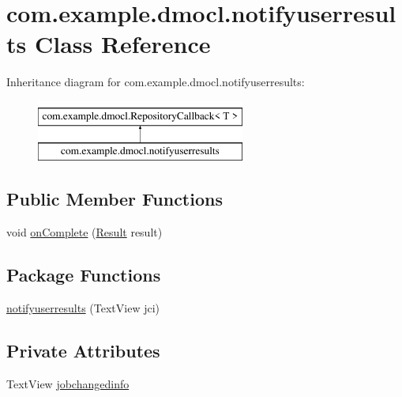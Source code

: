 \hypertarget{classcom_1_1example_1_1dmocl_1_1notifyuserresults}{}\section{com.\+example.\+dmocl.\+notifyuserresults Class Reference}
\label{classcom_1_1example_1_1dmocl_1_1notifyuserresults}
Inheritance diagram for com.\+example.\+dmocl.\+notifyuserresults\+:\begin{figure}[H]
\begin{center}
\leavevmode
\includegraphics[height=2.000000cm]{classcom_1_1example_1_1dmocl_1_1notifyuserresults}
\end{center}
\end{figure}
\subsection*{Public Member Functions}
\begin{DoxyCompactItemize}
\item 
void \mbox{\hyperlink{classcom_1_1example_1_1dmocl_1_1notifyuserresults_a30745572df65714feeeeec318f7f953c}{on\+Complete}} (\mbox{\hyperlink{classcom_1_1example_1_1dmocl_1_1Result}{Result}} result)
\end{DoxyCompactItemize}
\subsection*{Package Functions}
\begin{DoxyCompactItemize}
\item 
\mbox{\hyperlink{classcom_1_1example_1_1dmocl_1_1notifyuserresults_ae0d64e686ac66ab3d1ae1d6d8fc46973}{notifyuserresults}} (Text\+View jci)
\end{DoxyCompactItemize}
\subsection*{Private Attributes}
\begin{DoxyCompactItemize}
\item 
Text\+View \mbox{\hyperlink{classcom_1_1example_1_1dmocl_1_1notifyuserresults_a4ac59e51f28a7d8cb31f91179272cb01}{jobchangedinfo}}
\end{DoxyCompactItemize}
